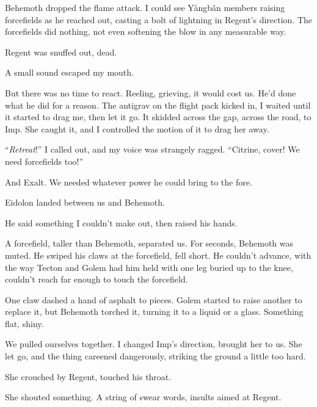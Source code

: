 Behemoth dropped the flame attack.  I could see Y\`{a}ngb\v{a}n members raising forcefields as he reached out, casting a bolt of lightning in Regent's direction.  The forcefields did nothing, not even softening the blow in any measurable way.



Regent was snuffed out, dead.



A small sound escaped my mouth.



But there was no time to react.  Reeling, grieving, it would cost us.  He'd done what he did for a reason.  The antigrav on the flight pack kicked in, I waited until it started to drag me, then let it go.  It skidded across the gap, across the road, to Imp.  She caught it, and I controlled the motion of it to drag her away.



``\emph{Retreat}!'' I called out, and my voice was strangely ragged.  ``Citrine, cover!  We need forcefields too!''



And Exalt.  We needed whatever power he could bring to the fore.



Eidolon landed between us and Behemoth.



He said something I couldn't make out, then raised his hands.



A forcefield, taller than Behemoth, separated us.  For seconds, Behemoth was muted.  He swiped his claws at the forcefield, fell short.  He couldn't advance, with the way Tecton and Golem had him held with one leg buried up to the knee, couldn't reach far enough to touch the forcefield.



One claw dashed a hand of asphalt to pieces.  Golem started to raise another to replace it, but Behemoth torched it, turning it to a liquid or a glass.  Something flat, shiny.



We pulled ourselves together.  I changed Imp's direction, brought her to us.  She let go, and the thing careened dangerously, striking the ground a little too hard.



She crouched by Regent, touched his throat.



She shouted something.  A string of swear words, insults aimed at Regent.



